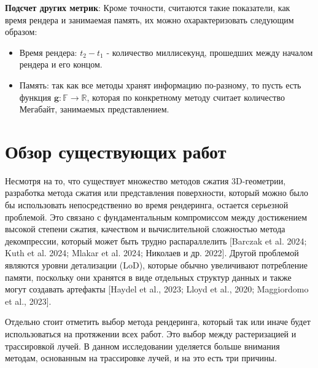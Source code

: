 \documentclass[a4paper,hidelinks,12pt]{article}
\begin{document}
\textbf{Подсчет других метрик}: \newline Кроме точности, считаются такие показатели, как время рендера и занимаемая память, их можно охарактеризовать следующим образом:

\begin{itemize}[leftmargin=4em]
	\item Время рендера: $t_2 - t_1$ - количество миллисекунд, прошедших между началом рендера и его концом.
	\item Память: так как все методы хранят информацию по-разному, то пусть есть функция $\textbf{g} : \mathbb{F} \to \mathbb{R}$, которая по конкретному методу считает количество Мегабайт, занимаемых представлением.
\end{itemize}

\newpage

\section{Обзор существующих работ}

Несмотря на то, что существует множество методов сжатия 3D-геометрии, разработка метода сжатия или представления 
поверхности, который можно было бы использовать непосредственно во время рендеринга, остается серьезной проблемой. 
Это связано с фундаментальным компромиссом между достижением высокой степени сжатия, качеством и вычислительной сложностью 
метода декомпрессии, который может быть трудно распараллелить [Barczak et al. 2024; Kuth et al. 2024; Mlakar et al. 2024; Николаев и др. 2022]. 
Другой проблемой являются уровни детализации (LoD), которые обычно увеличивают потребление памяти, поскольку они хранятся в виде отдельных 
структур данных и также могут создавать артефакты [Haydel et al., 2023; Lloyd et al., 2020; Maggiordomo et al., 2023]. 

Отдельно стоит отметить выбор метода рендеринга, который так или иначе будет использоваться на протяжении всех работ. 
Это выбор между растеризацией и трассировкой лучей. В данном исследовании уделяется больше внимания методам, основанным 
на трассировке лучей, и на это есть три причины.
\end{document}
